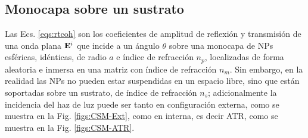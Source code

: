 	 \subsection{Monocapa sobre un sustrato}

Las Ecs. \eqref{eqs:rtcoh} son los coeficientes de amplitud de reflexión y transmisión de una onda plana $\vb{E}^i$ que incide a un ángulo $\theta$ sobre una monocapa de NPs esféricas, idénticas, de radio $a$ e índice de refracción $n_p$, localizadas de forma aleatoria e inmersa en una matriz con índice de refracción $n_m$. Sin embargo, en la realidad las NPs no pueden estar suspendidas en un espacio libre, sino que están soportadas sobre un sustrato, de índice de refracción $n_s$; adicionalmente la incidencia del haz de luz puede ser tanto en configuración externa, como se muestra en la Fig. \ref{figs:CSM-Ext}, como en interna, es decir ATR, como se muestra en la Fig. \ref{figs:CSM-ATR}.

